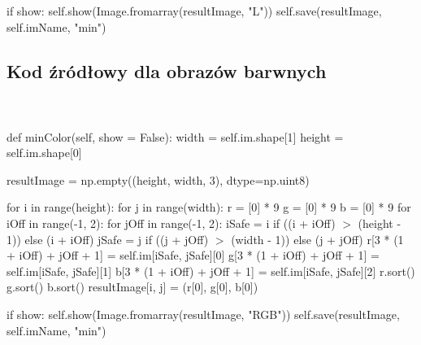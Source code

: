 \documentclass[final,a4paper,openany,12pt]{mwbk}
\begin{document}
if show: \newline
\indent self.show(Image.fromarray(resultImage, "L")) \newline
\indent self.save(resultImage, self.imName, "min") \newline


\newpage
\subsection*{Kod źródłowy dla obrazów barwnych}
\hfill
\\\\
\noindent def minColor(self, show = False): \newline
\indent width = self.im.shape[1] \newline
\indent height = self.im.shape[0] \newline

resultImage = np.empty((height, width, 3), dtype=np.uint8) \newline

for i in range(height): \newline
\indent for j in range(width): \newline
\indent r = [0] * 9 \newline
\indent g = [0] * 9 \newline
\indent b = [0] * 9 \newline
\indent for iOff in range(-1, 2): \newline
\indent for jOff in range(-1, 2): \newline
\indent iSafe = i if ((i + iOff) $>$ (height - 1)) else (i + iOff) \newline
\indent jSafe = j if ((j + jOff) $>$ (width - 1)) else (j + jOff) \newline
\indent r[3 * (1 + iOff) + jOff + 1] = self.im[iSafe, jSafe][0] \newline
\indent g[3 * (1 + iOff) + jOff + 1] = self.im[iSafe, jSafe][1] \newline
\indent b[3 * (1 + iOff) + jOff + 1] = self.im[iSafe, jSafe][2] \newline
\indent r.sort() \newline
\indent g.sort() \newline
\indent b.sort() \newline
\indent resultImage[i, j] = (r[0], g[0], b[0]) \newline

if show: \newline
\indent self.show(Image.fromarray(resultImage, "RGB")) \newline
\indent self.save(resultImage, self.imName, "min") \newline
\end{document}
